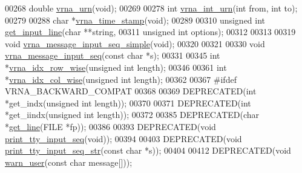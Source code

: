 \begin{DoxyCode}
00268 \textcolor{keywordtype}{double} \hyperlink{group__utils_ga384e256ebb295d04a14426179db0dd6e}{vrna\_urn}(\textcolor{keywordtype}{void});
00269 
00278 \textcolor{keywordtype}{int} \hyperlink{group__utils_ga46111bb3747dbcf4609f0d40ae169ad9}{vrna\_int\_urn}(\textcolor{keywordtype}{int} from, \textcolor{keywordtype}{int} to);
00279 
00288 \textcolor{keywordtype}{char}  *\hyperlink{group__utils_gad3bbe8d01afb1310609cb018d5290550}{vrna\_time\_stamp}(\textcolor{keywordtype}{void});
00289 
00310 \textcolor{keywordtype}{unsigned} \textcolor{keywordtype}{int} \hyperlink{group__utils_ga8ef1835eb83f542396f59f0b205965e5}{get\_input\_line}(\textcolor{keywordtype}{char} **\textcolor{keywordtype}{string},
00311                             \textcolor{keywordtype}{unsigned} \textcolor{keywordtype}{int} options);
00312 
00313 
00319 \textcolor{keywordtype}{void} \hyperlink{group__utils_gaee1dd652ca5b9e56b096963a1576f73b}{vrna\_message\_input\_seq\_simple}(\textcolor{keywordtype}{void});
00320 
00321 
00330 \textcolor{keywordtype}{void} \hyperlink{group__utils_gaf4d194d558b0c975f269de01dea52460}{vrna\_message\_input\_seq}(\textcolor{keyword}{const} \textcolor{keywordtype}{char} *s);
00331 
00345 \textcolor{keywordtype}{int} *\hyperlink{group__utils_ga70b180e9ea764218a82647a1cd347445}{vrna\_idx\_row\_wise}(\textcolor{keywordtype}{unsigned} \textcolor{keywordtype}{int} length);
00346 
00361 \textcolor{keywordtype}{int} *\hyperlink{group__utils_ga89ebc69c52fa0c78c9e1974b0017746b}{vrna\_idx\_col\_wise}(\textcolor{keywordtype}{unsigned} \textcolor{keywordtype}{int} length);
00362 
00367 \textcolor{preprocessor}{#ifdef  VRNA\_BACKWARD\_COMPAT}
00368 
00369 DEPRECATED(\textcolor{keywordtype}{int}   *get\_indx(\textcolor{keywordtype}{unsigned} \textcolor{keywordtype}{int} length));
00370 
00371 DEPRECATED(\textcolor{keywordtype}{int}   *get\_iindx(\textcolor{keywordtype}{unsigned} \textcolor{keywordtype}{int} length));
00372 
00385 DEPRECATED(\textcolor{keywordtype}{char}  *\hyperlink{utils_8h_abe51806d14cff0789a8c1df7dbc45b71}{get\_line}(FILE *fp));
00386 
00393 DEPRECATED(\textcolor{keywordtype}{void} \hyperlink{utils_8h_a6bf778117d31b7fd90db435323f4ef74}{print\_tty\_input\_seq}(\textcolor{keywordtype}{void}));
00394 
00403 DEPRECATED(\textcolor{keywordtype}{void} \hyperlink{utils_8h_ae4ef89b662a3e9b5b5f0781d9757aba0}{print\_tty\_input\_seq\_str}(\textcolor{keyword}{const} \textcolor{keywordtype}{char} *s));
00404 
00412 DEPRECATED(\textcolor{keywordtype}{void} \hyperlink{utils_8h_af2355fa8746f2f30fbe71db65dea3d51}{warn\_user}(\textcolor{keyword}{const} \textcolor{keywordtype}{char} message[]));

\end{DoxyCode}
